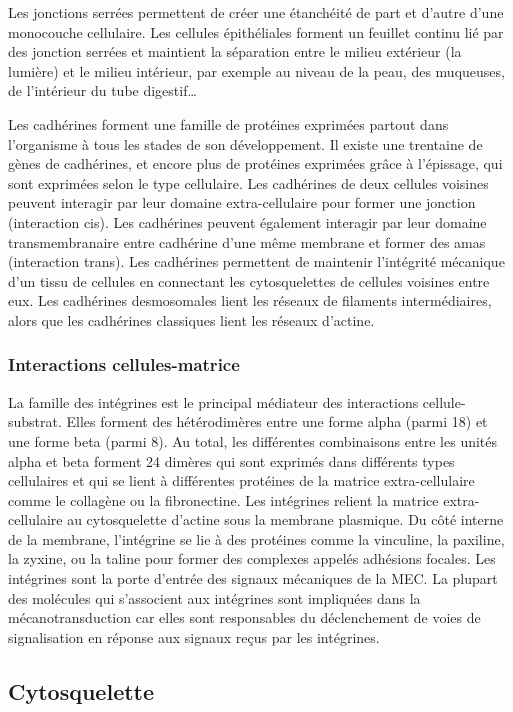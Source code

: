 \documentclass{report}
\begin{document}
Les jonctions serrées permettent de créer une étanchéité de part et d'autre d'une monocouche cellulaire. Les cellules épithéliales forment un feuillet continu lié par des jonction serrées et maintient la séparation entre le milieu extérieur (la lumière) et le milieu intérieur, par exemple au niveau de la peau, des muqueuses, de l'intérieur du tube digestif\dots

Les cadhérines forment une famille de protéines exprimées partout dans l'organisme à tous les stades de son développement. Il existe une trentaine de gènes de cadhérines, et encore plus de protéines exprimées grâce à l'épissage, qui sont exprimées selon le type cellulaire. 
Les cadhérines de deux cellules voisines peuvent interagir par leur domaine extra-cellulaire pour former une jonction (interaction cis). Les cadhérines peuvent également interagir par leur domaine transmembranaire entre cadhérine d'une même membrane et former des amas (interaction trans). 
Les cadhérines permettent de maintenir l'intégrité mécanique d'un tissu de cellules en connectant les cytosquelettes de cellules voisines entre eux. Les cadhérines desmosomales lient les réseaux de filaments intermédiaires, alors que les cadhérines classiques lient les réseaux d'actine. 


\subsubsection{Interactions cellules-matrice}

La famille des intégrines est le principal médiateur des interactions cellule-substrat. Elles forment des hétérodimères entre une forme alpha (parmi 18) et une forme beta (parmi 8). Au total, les différentes combinaisons entre les unités alpha et beta forment 24 dimères qui sont exprimés dans différents types cellulaires et qui se lient à différentes protéines de la matrice extra-cellulaire comme le collagène ou la fibronectine. 
Les intégrines relient la matrice extra-cellulaire au cytosquelette d'actine sous la membrane plasmique. Du côté interne de la membrane, l'intégrine se lie à des protéines comme la vinculine, la paxiline, la zyxine, ou la taline pour former des complexes appelés adhésions focales. 
Les intégrines sont la porte d'entrée des signaux mécaniques de la MEC. La plupart des molécules qui s'associent aux intégrines sont impliquées dans la mécanotransduction car elles sont responsables du déclenchement de voies de signalisation en réponse aux signaux reçus par les intégrines. 

\subsection{Cytosquelette}
\end{document}
